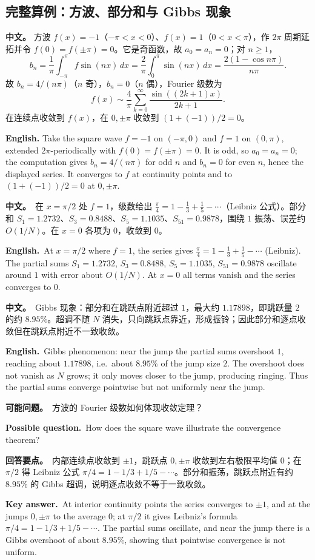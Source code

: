 \documentclass[UTF8,11pt,a4paper]{ctexart}
\newcommand{\BOTH}[2]{\par\noindent\textbf{中文。}\ #1\par\noindent\textbf{English.}\ #2\par}
\newcommand{\ASK}[4]{\begin{samepage}\par\noindent\textbf{可能问题。}\ #1\par\noindent\textbf{Possible question.}\ #2\par\noindent\textbf{回答要点。}\ #3\par\noindent\textbf{Key answer.}\ #4\medskip\end{samepage}}
\newcommand{\APS}[2]{\par\noindent\textbf{中文。} #1\par\noindent\textbf{English.} #2\par\smallskip}
\begin{document}
\subsection{完整算例：方波、部分和与 Gibbs 现象}
\APS{方波 $f(x)=-1$（$-\pi<x<0$）、$f(x)=1$（$0<x<\pi$），作 $2\pi$ 周期延拓并令 $f(0)=f(\pm\pi)=0$。它是奇函数，故 $a_0=a_n=0$；对 $n\ge1$，
\[
b_n=\frac1\pi\int_{-\pi}^{\pi}f\sin(nx)\,dx=\frac2\pi\int_0^{\pi}\sin(nx)\,dx=\frac{2(1-\cos n\pi)}{n\pi}.
\]
故 $b_n=4/(n\pi)$（$n$ 奇），$b_n=0$（$n$ 偶），Fourier 级数为
\[
f(x)\sim\frac4\pi\sum_{k=0}^{\infty}\frac{\sin((2k+1)x)}{2k+1}.
\]
在连续点收敛到 $f(x)$，在 $0,\pm\pi$ 收敛到 $(1+(-1))/2=0$。}{Take the square wave $f=-1$ on $(-\pi,0)$ and $f=1$ on $(0,\pi)$, extended $2\pi$-periodically with $f(0)=f(\pm\pi)=0$. It is odd, so $a_0=a_n=0$; the computation gives $b_n=4/(n\pi)$ for odd $n$ and $b_n=0$ for even $n$, hence the displayed series. It converges to $f$ at continuity points and to $(1+(-1))/2=0$ at $0,\pm\pi$.}
\BOTH{在 $x=\pi/2$ 处 $f=1$，级数给出 $\frac\pi4=1-\frac13+\frac15-\cdots$（Leibniz 公式）。部分和 $S_1=1.2732$、$S_3=0.8488$、$S_5=1.1035$、$S_{51}=0.9878$，围绕 $1$ 振荡、误差约 $O(1/N)$。在 $x=0$ 各项为 $0$，收敛到 $0$。}{At $x=\pi/2$ where $f=1$, the series gives $\frac\pi4=1-\frac13+\frac15-\cdots$ (Leibniz). The partial sums $S_1=1.2732$, $S_3=0.8488$, $S_5=1.1035$, $S_{51}=0.9878$ oscillate around $1$ with error about $O(1/N)$. At $x=0$ all terms vanish and the series converges to $0$.}
\BOTH{Gibbs 现象：部分和在跳跃点附近超过 $1$，最大约 $1.17898$，即跳跃量 $2$ 的约 $8.95\%$。超调不随 $N$ 消失，只向跳跃点靠近，形成振铃；因此部分和逐点收敛但在跳跃点附近不一致收敛。}{Gibbs phenomenon: near the jump the partial sums overshoot $1$, reaching about $1.17898$, i.e.\ about $8.95\%$ of the jump size $2$. The overshoot does not vanish as $N$ grows; it only moves closer to the jump, producing ringing. Thus the partial sums converge pointwise but not uniformly near the jump.}
\ASK{方波的 Fourier 级数如何体现收敛定理？}{How does the square wave illustrate the convergence theorem?}{内部连续点收敛到 $\pm1$，跳跃点 $0,\pm\pi$ 收敛到左右极限平均值 $0$；在 $\pi/2$ 得 Leibniz 公式 $\pi/4=1-1/3+1/5-\cdots$。部分和振荡，跳跃点附近有约 $8.95\%$ 的 Gibbs 超调，说明逐点收敛不等于一致收敛。}{At interior continuity points the series converges to $\pm1$, and at the jumps $0,\pm\pi$ to the average $0$; at $\pi/2$ it gives Leibniz's formula $\pi/4=1-1/3+1/5-\cdots$. The partial sums oscillate, and near the jump there is a Gibbs overshoot of about $8.95\%$, showing that pointwise convergence is not uniform.}
\end{document}
